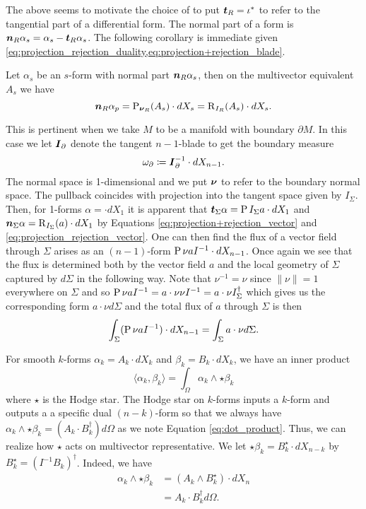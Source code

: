 The above seems to motivate the choice of \cite{schwarz_hodge_1995} to put $\boldsymbol{t}_R = \iota^*$ to refer to the tangential part of a differential form. The normal part of a form is $\boldsymbol{n}_R \alpha_s = \alpha_s - \boldsymbol{t}_R \alpha_s$. The following corollary is immediate given \cref{eq:projection_rejection_duality,eq:projection+rejection_blade}. 
\begin{corollary}
Let $\alpha_s$ be an $s$-form with normal part $\boldsymbol{n}_R \alpha_s$, then on the multivector equivalent $A_s$ we have
\begin{equation}
\boldsymbol{n}_R \alpha_p = \operatorname{P}_{\boldsymbol{\nu}_R}(A_s)\cdot dX_s = \operatorname{R}_{I_R}(A_s)\cdot dX_s.
\end{equation}
\end{corollary}

This is pertinent when we take $M$ to be a manifold with boundary $\partial M$. In this case we let $\boldsymbol{I}_\partial$ denote the tangent $n-1$-blade to get the boundary measure
\begin{equation}
\omega_\partial \coloneqq \boldsymbol{I}_\partial^{-1} \cdot dX_{n-1}.
\end{equation}
The normal space is 1-dimensional and we put $\boldsymbol{\nu}$ to refer to the boundary normal space. The pullback coincides with projection into the tangent space given by $I_\Sigma$.  Then, for 1-forms $\alpha = \cdot dX_1$ it is apparent that $\boldsymbol{t}_\Sigma \alpha = \operatorname{P}{I_\Sigma}{a} \cdot dX_1$ and $\boldsymbol{n}_\Sigma \alpha = \operatorname{R}_{I_\Sigma}(a) \cdot dX_1$ by Equations \ref{eq:projection+rejection_vector} and \ref{eq:projection_rejection_vector}. One can then find the flux of a vector field through $\Sigma$ arises as an $(n-1)$-form $\operatorname{P}{\nu}{a} I^{-1} \cdot dX_{n-1}$. Once again we see that the flux is determined both by the vector field $a$ and the local geometry of $\Sigma$ captured by $d\Sigma$ in the following way. Note that  $\nu^{-1}=\nu$ since $\|\nu\|=1$ everywhere on $\Sigma$ and so $\operatorname{P}{\nu}{a} I^{-1}= a \cdot \nu \nu I^{-1} = a \cdot \nu I_\Sigma^\dagger$ which gives us the corresponding form $a \cdot \nu d\Sigma$ and the total flux of $a$ through $\Sigma$ is then
\[
\int_\Sigma (\operatorname{P}{\nu}{a} I^{-1}) \cdot dX_{n-1} = \int_\Sigma a \cdot \nu d\Sigma.
\]

For smooth $k$-forms $\alpha_k = A_k \cdot dX_k$ and $\beta_k = B_k \cdot dX_k$, we have an inner product 
\[
\langle \alpha_k, \beta_k \rangle = \int_\Omega \alpha_k \wedge \star \beta_k 
\]
where $\star$ is the Hodge star. The Hodge star on $k$-forms inputs a $k$-form and outputs a a specific dual $(n-k)$-form so that we always have $\alpha_k \wedge \star \beta_k  = (A_k\cdot B_k^\dagger)d\Omega$ as we note Equation \ref{eq:dot_product}. Thus, we can realize how $\star$ acts on multivector representative. We let $\star \beta_k = B_k^\star \cdot dX_{n-k}$ by $B_k^\star = (I^{-1} B_k)^\dagger$.  Indeed, we have
\begin{align*}
    \alpha_k \wedge \star \beta_k &= (A_k \wedge B_k^\star) \cdot dX_n\\
    &= A_k \cdot B_k^\dagger d\Omega.
\end{align*}

